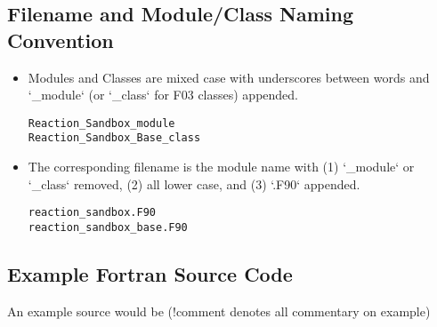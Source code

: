 \subsection*{Filename and Module/Class Naming Convention}

\begin{itemize}
\item Modules and Classes are mixed case with underscores between words and `\_module` (or `\_class` for F03 classes) appended.

\begin{Verbatim}
Reaction_Sandbox_module
Reaction_Sandbox_Base_class
\end{Verbatim}

\item The corresponding filename is the module name with (1) `\_module` or `\_class` removed, (2) all lower case, and (3) `.F90` appended.

\begin{Verbatim}
reaction_sandbox.F90
reaction_sandbox_base.F90
\end{Verbatim}
\end{itemize}

\subsection*{Example Fortran Source Code}

An example source would be (!comment denotes all commentary on example)

